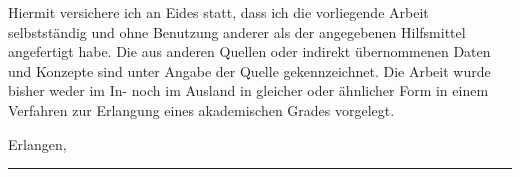 


Hiermit versichere ich an Eides statt, dass ich die vorliegende Arbeit selbstst{\"a}ndig
und ohne Benutzung anderer als der angegebenen Hilfsmittel angefertigt habe. Die aus
anderen Quellen oder indirekt {\"u}bernommenen Daten und Konzepte sind unter Angabe der
Quelle gekennzeichnet. Die Arbeit wurde bisher weder im In- noch im Ausland in gleicher
oder {\"a}hnlicher Form in einem Verfahren zur Erlangung eines akademischen Grades vorgelegt.

\vspace{1.5cm}

Erlangen, \myTime
\vspace{1.5cm}

\rule{4cm}{0.2mm}
\newline
\myName
\vfill
\newpage

